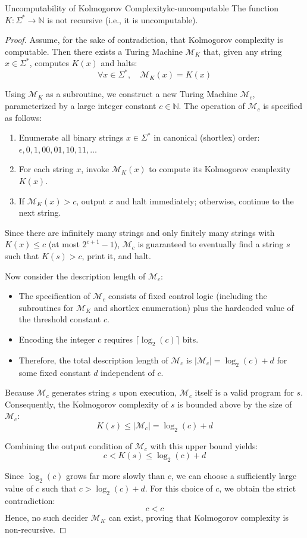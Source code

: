 \begin{theorem}{Uncomputability of Kolmogorov Complexity}{kc-uncomputable}
The function $K: \Sigma^* \to \mathbb{N}$ is not recursive (i.e., it is uncomputable).
\begin{proof}
Assume, for the sake of contradiction, that Kolmogorov complexity is computable. Then there exists a Turing Machine $\mathcal{M}_K$ that, given any string $x \in \Sigma^*$, computes $K(x)$ and halts:
$$\forall x \in \Sigma^*, \quad \mathcal{M}_K(x) = K(x)$$

Using $\mathcal{M}_K$ as a subroutine, we construct a new Turing Machine $\mathcal{M}_c$, parameterized by a large integer constant $c \in \mathbb{N}$. The operation of $\mathcal{M}_c$ is specified as follows:
\begin{enumerate}
    \item Enumerate all binary strings $x \in \Sigma^*$ in canonical (shortlex) order: $\epsilon, 0, 1, 00, 01, 10, 11, \dots$
    \item For each string $x$, invoke $\mathcal{M}_K(x)$ to compute its Kolmogorov complexity $K(x)$.
    \item If $\mathcal{M}_K(x) > c$, output $x$ and halt immediately; otherwise, continue to the next string.
\end{enumerate}

Since there are infinitely many strings and only finitely many strings with $K(x) \le c$ (at most $2^{c+1}-1$), $\mathcal{M}_c$ is guaranteed to eventually find a string $s$ such that $K(s) > c$, print it, and halt.

Now consider the description length of $\mathcal{M}_c$:
\begin{itemize}
    \item The specification of $\mathcal{M}_c$ consists of fixed control logic (including the subroutines for $\mathcal{M}_K$ and shortlex enumeration) plus the hardcoded value of the threshold constant $c$.
    \item Encoding the integer $c$ requires $\lceil \log_2(c) \rceil$ bits.
    \item Therefore, the total description length of $\mathcal{M}_c$ is $\vert{}\mathcal{M}_c\vert{} = \log_2(c) + d$ for some fixed constant $d$ independent of $c$.
\end{itemize}

Because $\mathcal{M}_c$ generates string $s$ upon execution, $\mathcal{M}_c$ itself is a valid program for $s$. Consequently, the Kolmogorov complexity of $s$ is bounded above by the size of $\mathcal{M}_c$:
$$K(s) \le \vert{}\mathcal{M}_c\vert{} = \log_2(c) + d$$

Combining the output condition of $\mathcal{M}_c$ with this upper bound yields:
$$c < K(s) \le \log_2(c) + d$$

Since $\log_2(c)$ grows far more slowly than $c$, we can choose a sufficiently large value of $c$ such that $c > \log_2(c) + d$. For this choice of $c$, we obtain the strict contradiction:
$$c < c$$
Hence, no such decider $\mathcal{M}_K$ can exist, proving that Kolmogorov complexity is non-recursive.
\end{proof}
\end{theorem}

